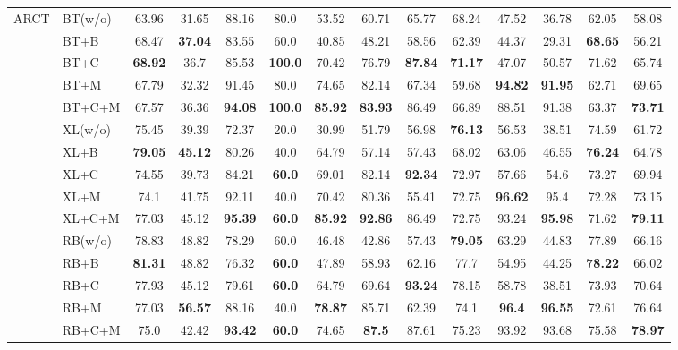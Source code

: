 \documentclass{ecai}  %
\begin{document}
\begin{table*}[th]
\begin{tabular}{ll|c|ccccccccccc}
	\midrule
\multirow{15}{*}{ARCT} 
 		    
                &  BT(w/o) &63.96&31.65&88.16&80.0&53.52&60.71&65.77&68.24&47.52&36.78&62.05&58.08
                						\\ 
		&  BT+B &68.47&\bf{37.04}&83.55&60.0&40.85&48.21&58.56&62.39&44.37&29.31&\bf{68.65}&56.21
 						        \\ 
		&  BT+C & \bf{68.92} &36.7&85.53&\bf{100.0}&70.42&76.79&\bf{87.84}&\bf{71.17}&47.07&50.57&71.62&65.74
 						        \\ 
		   & BT+M &67.79&32.32&91.45&80.0&74.65&82.14&67.34&59.68&\bf{94.82}&\bf{91.95}&62.71&69.65
 						       \\ 
		   & BT+C+M& 67.57&36.36&\bf{94.08}&\bf{100.0}&\bf{85.92}&\bf{83.93}&86.49&66.89&88.51&91.38&63.37&\bf{73.71}
		
 					     	       \\ \cmidrule{2-14}
						          
			&  XL(w/o) & 75.45&39.39&72.37&20.0&30.99&51.79&56.98&\bf{76.13}&56.53&38.51&74.59&61.72
                						\\ 
		&  XL+B & \bf{79.05}&\bf{45.12}&80.26&40.0&64.79&57.14&57.43&68.02&63.06&46.55&\bf{76.24}&64.78
 						        \\ 
		&  XL+C & 74.55&39.73&84.21&\bf{60.0}&69.01&82.14&\bf{92.34}&72.97&57.66&54.6&73.27&69.94
 						        \\ 
		   & XL+M & 74.1&41.75&92.11&40.0&70.42&80.36&55.41&72.75&\bf{96.62}&95.4&72.28&73.15
 						       \\ 
		   & XL+C+M& 77.03&45.12&\bf{95.39}&\bf{60.0}&\bf{85.92}&\bf{92.86}&86.49&72.75&93.24&\bf{95.98}&71.62&\bf{79.11}
 					     	       \\ \cmidrule{2-14}
	&  RB(w/o) & 78.83&48.82&78.29&60.0&46.48&42.86&57.43&\bf{79.05}&63.29&44.83&77.89&66.16
                						\\ 
		&  RB+B & \bf{81.31}&48.82&76.32&\bf{60.0}&47.89&58.93&62.16&77.7&54.95&44.25&\bf{78.22}&66.02
 						        \\ 
		&  RB+C &77.93&45.12&79.61&\bf{60.0}&64.79&69.64&\bf{93.24}&78.15&58.78&38.51&73.93&70.64
 						        \\ 
		   & RB+M & 77.03&\bf{56.57}&88.16&40.0&\bf{78.87}&85.71&62.39&74.1&\bf{96.4}&\bf{96.55}&72.61&76.64
 						       \\ 
		   & RB+C+M&75.0&42.42&\bf{93.42}&\bf{60.0}&74.65&\bf{87.5}&87.61&75.23&93.92&93.68&75.58&\bf{78.97}
 					     	       \\ 


\end{tabular}
\end{table*}
\end{document}
